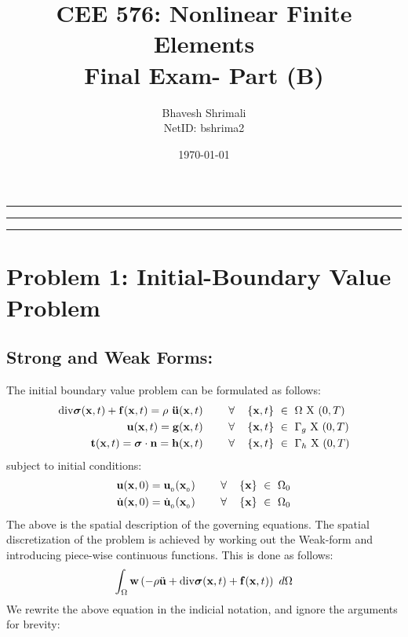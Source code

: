 
\usepackage{graphicx}
\title{\bf CEE 576: Nonlinear Finite Elements \\ Final Exam- Part (B)}
\author{Bhavesh Shrimali \\ NetID: bshrima2}
\date{\today}

\maketitle \hrule\hrule\hrule
\section*{Problem 1: Initial-Boundary Value Problem}
\subsection*{Strong and Weak Forms: }
The initial boundary value problem can be formulated as follows: 
\begin{align*}
{\rm div} 
{\bm \sigma} ({\bf x},t)
+ 
{\bf f}({\bf x},t)
=
\rho\ {\bf \ddot{u}} ({\bf x},t) \ \ \ \ \ \ \ \forall \ \ \ \left\{{\bf x},t\right\}\  & \in\  \Omega\  {\rm X}\  (0,T) \\
{\bf u} ({\bf x},t) = {\bf g}({\bf x},t) \ \ \ \ \ \ \ \forall \ \ \ \left\{ {\bf x},t \right\}\ & \in\ \Gamma_g\  {\rm X}\  (0,T)\\
{\bf t} ({\bf x},t)
=
{\bm\sigma}\cdot{\bf n}
= 
{\bf h}({\bf x},t)
 \ \ \ \ \ \ \ \forall \ \ \ \left\{ {\bf x},t \right\}\ & \in\ \Gamma_h\  {\rm X}\  (0,T)
\end{align*}
subject to initial conditions: 
\begin{align*}
{\bf u}
({\bf x},0)
 =
 {\bf u}_{_0} ({\bf x}_{_0})  \ \ \ \ \ \ \ \forall \ \ \ \left\{ {\bf x} \right\}\ & \in\ \Omega_0 \\
 \dot{\bf u}
({\bf x},0)
 =
 \dot{\bf u}_{_0} ({\bf x}_{_0})  \ \ \ \ \ \ \ \forall \ \ \ \left\{ {\bf x} \right\}\ & \in\ \Omega_0
\end{align*}
The above is the spatial description of the governing equations. The spatial discretization of the problem is achieved by working out the Weak-form and introducing piece-wise continuous functions. This is done as follows: 
\begin{align*}
\int_{\Omega}
{\bf w}
\left(
- \rho\ddot{\bf u}
+ {\rm div} 
{\bm \sigma} ({\bf x},t)
+ 
{\bf f}({\bf x},t)
\right)\ d\Omega
\end{align*} 
We rewrite the above equation in the indicial notation, and ignore the arguments for brevity: 
